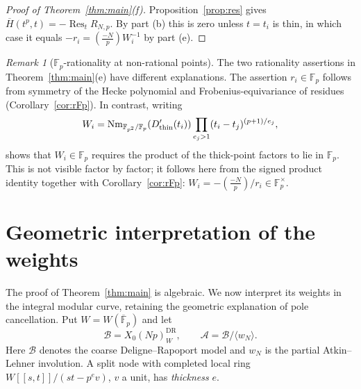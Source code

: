 \documentclass[11pt,a4paper]{article}
\numberwithin{equation}{section}
\theoremstyle{definition}
\theoremstyle{remark}
\newtheorem{remark}[theorem]{Remark}
\newcommand{\Fp}{\mathbb F_p}
\newcommand{\Fq}{\mathbb F_{p^2}}
\newcommand{\Fb}{\overline{\mathbb F}_p}
\newcommand{\Res}{\operatorname{Res}}
\newcommand{\Lp}[1]{\left(\frac{#1}{p}\right)}
\begin{document}
\begin{proof}[Proof of Theorem~\ref{thm:main}(f)]
Proposition~\ref{prop:res} gives
$\overline H(t^p,t)=-\Res_tR_{N,p}$. By part (b) this is zero
unless $t=t_i$ is thin, in which case it equals
$-r_i=\Lp{-N}W_i^{-1}$ by part (e).
\end{proof}

\begin{remark}[$\Fp$-rationality at non-rational points]
The two rationality assertions in Theorem~\ref{thm:main}(e) have different
explanations. The assertion $r_i\in\Fp$ follows from symmetry of the
Hecke polynomial and Frobenius-equivariance of residues
(Corollary~\ref{cor:rFp}). In contrast, writing
\[
W_i=\operatorname{Nm}_{\Fq/\Fp}(D_{\rm thin}'(t_i))
\prod_{e_j>1}(t_i-t_j)^{(p+1)/e_j},
\]
shows that $W_i\in\Fp$ requires the product of the thick-point factors
to lie in $\Fp$. This is not visible factor by factor; it follows here
from the signed product identity together with Corollary~\ref{cor:rFp}:
$W_i=-\Lp{-N}/r_i\in\Fp^\times$.
\end{remark}


\section{Geometric interpretation of the weights}\label{sec:geometry}
The proof of Theorem~\ref{thm:main} is algebraic. We now interpret its weights in
the integral modular curve, retaining the geometric explanation of pole cancellation.
Put $W=W(\Fb)$ and let
\[
\mathcal B=X_0(Np)^{\mathrm{DR}}_W,\qquad
\mathcal A=\mathcal B/\langle w_N\rangle.
\]
Here $\mathcal B$ denotes the coarse Deligne--Rapoport model and $w_N$ is the
partial Atkin--Lehner involution. A split node with completed local ring
$W[[s,t]]/(st-p^ev)$, $v$ a unit, has \emph{thickness} $e$.
\end{document}
